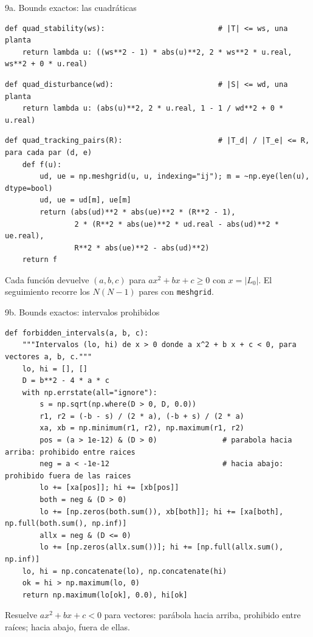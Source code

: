 \documentclass[aspectratio=169,11pt]{beamer}
\begin{document}
\begin{frame}[fragile]{9a. Bounds exactos: las cuadráticas}
\scriptsize
\begin{verbatim}
def quad_stability(ws):                          # |T| <= ws, una planta
    return lambda u: ((ws**2 - 1) * abs(u)**2, 2 * ws**2 * u.real, ws**2 + 0 * u.real)
\end{verbatim}
\scriptsize
\begin{verbatim}
def quad_disturbance(wd):                        # |S| <= wd, una planta
    return lambda u: (abs(u)**2, 2 * u.real, 1 - 1 / wd**2 + 0 * u.real)
\end{verbatim}
\scriptsize
\begin{verbatim}
def quad_tracking_pairs(R):                      # |T_d| / |T_e| <= R, para cada par (d, e)
    def f(u):
        ud, ue = np.meshgrid(u, u, indexing="ij"); m = ~np.eye(len(u), dtype=bool)
        ud, ue = ud[m], ue[m]
        return (abs(ud)**2 * abs(ue)**2 * (R**2 - 1),
                2 * (R**2 * abs(ue)**2 * ud.real - abs(ud)**2 * ue.real),
                R**2 * abs(ue)**2 - abs(ud)**2)
    return f
\end{verbatim}
\footnotesize Cada función devuelve $(a,b,c)$ para $a x^2+bx+c\ge0$ con $x=|L_0|$. El seguimiento recorre los $N(N-1)$ pares con \texttt{meshgrid}.
\end{frame}

\begin{frame}[fragile]{9b. Bounds exactos: intervalos prohibidos}
\scriptsize
\begin{verbatim}
def forbidden_intervals(a, b, c):
    """Intervalos (lo, hi) de x > 0 donde a x^2 + b x + c < 0, para vectores a, b, c."""
    lo, hi = [], []
    D = b**2 - 4 * a * c
    with np.errstate(all="ignore"):
        s = np.sqrt(np.where(D > 0, D, 0.0))
        r1, r2 = (-b - s) / (2 * a), (-b + s) / (2 * a)
        xa, xb = np.minimum(r1, r2), np.maximum(r1, r2)
        pos = (a > 1e-12) & (D > 0)               # parabola hacia arriba: prohibido entre raices
        neg = a < -1e-12                          # hacia abajo: prohibido fuera de las raices
        lo += [xa[pos]]; hi += [xb[pos]]
        both = neg & (D > 0)
        lo += [np.zeros(both.sum()), xb[both]]; hi += [xa[both], np.full(both.sum(), np.inf)]
        allx = neg & (D <= 0)
        lo += [np.zeros(allx.sum())]; hi += [np.full(allx.sum(), np.inf)]
    lo, hi = np.concatenate(lo), np.concatenate(hi)
    ok = hi > np.maximum(lo, 0)
    return np.maximum(lo[ok], 0.0), hi[ok]
\end{verbatim}
\footnotesize Resuelve $a x^2+bx+c<0$ para vectores: parábola hacia arriba, prohibido entre raíces; hacia abajo, fuera de ellas.
\end{frame}
\end{document}
